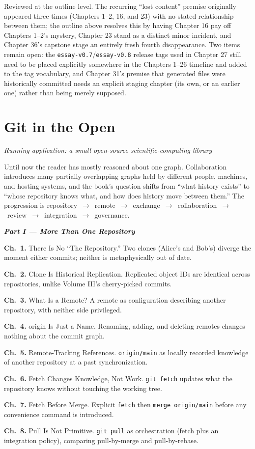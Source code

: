 \documentclass[11pt]{book}
\newcommand{\subheading}[1]{\bigskip\noindent{\bfseries\itshape #1}\smallskip\par}
\newcommand{\chapentry}[2]{\noindent\textbf{Ch.~#1.} #2\par\smallskip}
\newcommand{\partheading}[1]{\bigskip\noindent\textbf{\textit{#1}}\smallskip\par}
\begin{document}
\subheading{Status and Open Items}
Reviewed at the outline level. The recurring ``lost content'' premise originally appeared three times (Chapters 1--2, 16, and 23) with no stated relationship between them; the outline above resolves this by having Chapter 16 pay off Chapters 1--2's mystery, Chapter 23 stand as a distinct minor incident, and Chapter 36's capstone stage an entirely fresh fourth disappearance. Two items remain open: the \texttt{essay-v0.7}/\texttt{essay-v0.8} release tags used in Chapter 27 still need to be placed explicitly somewhere in the Chapters 1--26 timeline and added to the tag vocabulary, and Chapter 31's premise that generated files were historically committed needs an explicit staging chapter (its own, or an earlier one) rather than being merely supposed.

\chapter{Git in the Open}
\textit{Running application: a small open-source scientific-computing library}

\subheading{Governing Idea}
Until now the reader has mostly reasoned about one graph. Collaboration introduces many partially overlapping graphs held by different people, machines, and hosting systems, and the book's question shifts from ``what history exists'' to ``whose repository knows what, and how does history move between them.'' The progression is repository~$\to$~remote~$\to$~exchange~$\to$~collaboration~$\to$~review~$\to$~integration~$\to$~governance.

\subheading{Chapter Outline}

\partheading{Part I --- More Than One Repository}
\chapentry{1}{There Is No ``The Repository.'' Two clones (Alice's and Bob's) diverge the moment either commits; neither is metaphysically out of date.}
\chapentry{2}{Clone Is Historical Replication. Replicated object IDs are identical across repositories, unlike Volume III's cherry-picked commits.}
\chapentry{3}{What Is a Remote? A remote as configuration describing another repository, with neither side privileged.}
\chapentry{4}{origin Is Just a Name. Renaming, adding, and deleting remotes changes nothing about the commit graph.}
\chapentry{5}{Remote-Tracking References. \texttt{origin/main} as locally recorded knowledge of another repository at a past synchronization.}
\chapentry{6}{Fetch Changes Knowledge, Not Work. \texttt{git fetch} updates what the repository knows without touching the working tree.}
\chapentry{7}{Fetch Before Merge. Explicit \texttt{fetch} then \texttt{merge origin/main} before any convenience command is introduced.}
\chapentry{8}{Pull Is Not Primitive. \texttt{git pull} as orchestration (fetch plus an integration policy), comparing pull-by-merge and pull-by-rebase.}
\end{document}
